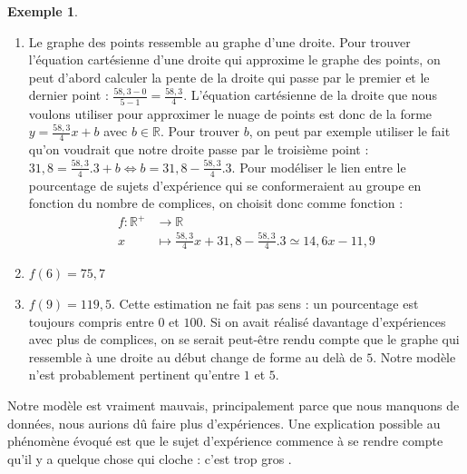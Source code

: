 \documentclass[a4paper,13pt]{scrreprt}
\theoremstyle{plain}
\theoremstyle{definition}
\newtheorem{exe}[subsection]{Exemple}
\newcommand{\rr}{\mathbb{R}}
\begin{document}
\begin{exe}
\begin{enumerate}
		\item Le graphe des points ressemble au graphe d'une droite. Pour trouver l'équation cartésienne d'une droite qui approxime le graphe des points, on peut d'abord calculer la pente de la droite qui passe par le premier et le dernier point : $\frac{58,3 - 0}{5-1}=\frac{58,3}{4}$. L'équation cartésienne de la droite que nous voulons utiliser pour approximer le nuage de points est donc de la forme $y=\frac{58,3}{4}x +b$ avec $b\in \rr$. Pour trouver $b$, on peut par exemple utiliser le fait qu'on voudrait que notre droite passe par le troisième point : $31,8=\frac{58,3}{4}.3+b \Leftrightarrow b=31,8-\frac{58,3}{4}.3$. Pour modéliser le lien entre le pourcentage de sujets d'expérience qui se conformeraient au groupe en fonction du nombre de complices, on choisit donc comme fonction :
		\begin{align*}
		f : {\rr}^{+} &\to \rr \\
		x &\mapsto \frac{58,3}{4}x + 31,8-\frac{58,3}{4}.3 \simeq 14,6x -11,9
		\end{align*}
		\item $f(6)=75,7$
		\item $f(9)=119,5$. Cette estimation ne fait pas sens : un pourcentage est toujours compris entre $0$ et $100$. Si on avait réalisé davantage d'expériences avec plus de complices, on se serait peut-être rendu compte que le graphe qui ressemble à une droite au début change de forme au delà de $5$. Notre modèle n'est probablement pertinent qu'entre $1$ et $5$.
	\end{enumerate}
	Notre modèle est vraiment mauvais, principalement parce que nous manquons de données, nous aurions dû faire plus d'expériences. Une explication possible au phénomène évoqué est que le sujet d'expérience commence à se rendre compte qu'il y a quelque chose qui cloche : c'est \og trop gros \fg{}.
\end{exe}
\end{document}

